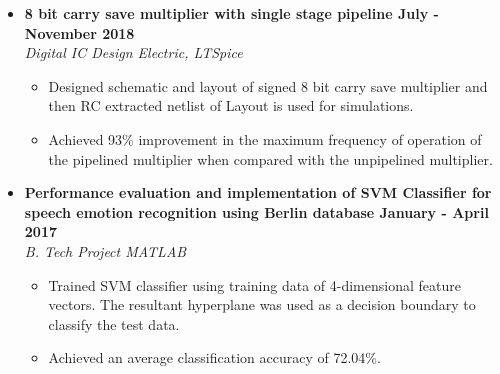\documentclass[a4paper,11pt]{article}
\newcommand{\isep}{-2 pt}
\newcommand{\spsep}{-0.75cm}
\begin{document}
\begin{itemize}
\begin{itemize}
	\end{itemize}
	
	\item \textbf{8 bit carry save multiplier with single stage pipeline \hfill July - November 2018} \\
	\emph{Digital IC Design \hfill  Electric, LTSpice} \\[\spsep]
	\begin{itemize} \itemsep \isep
		\item Designed schematic and layout of signed 8 bit carry save multiplier and then RC extracted netlist of Layout is used for simulations.
		\item Achieved 93\% improvement in the maximum frequency of operation of the pipelined multiplier when compared with the unpipelined multiplier.
	\end{itemize}
	
	\item \textbf{Performance evaluation and implementation of SVM Classifier for speech emotion recognition using Berlin database \hfill January - April 2017} \\
	\emph{B. Tech Project  \hfill  MATLAB} \\[\spsep]
	\begin{itemize} \itemsep \isep
		\item Trained SVM classifier using training data of 4-dimensional feature vectors. The resultant hyperplane was used as a decision boundary to classify the test data.%
		\item Achieved an average classification accuracy of 72.04\%.
	\end{itemize}
	
\end{itemize}
\pagebreak
\end{document}
